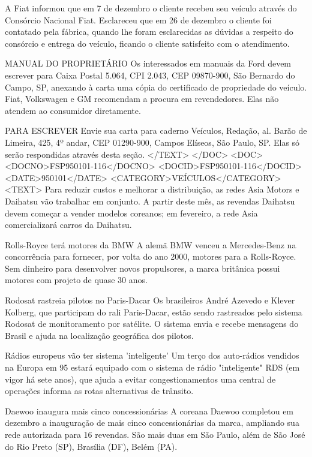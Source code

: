 A Fiat informou que em 7 de dezembro o cliente recebeu seu veículo através do Consórcio Nacional Fiat. Esclareceu que em 26 de dezembro o cliente foi contatado pela fábrica, quando lhe foram esclarecidas as dúvidas a respeito do consórcio e entrega do veículo, ficando o cliente satisfeito com o atendimento.

MANUAL DO PROPRIETÁRIO 
Os interessados em manuais da Ford devem escrever para Caixa Postal 5.064, CPI 2.043, CEP 09870-900, São Bernardo do Campo, SP, anexando à carta uma cópia do certificado de propriedade do veículo. Fiat, Volkswagen e GM recomendam a procura em revendedores. Elas não atendem ao consumidor diretamente.

PARA ESCREVER 
Envie sua carta para caderno Veículos, Redação, al. Barão de Limeira, 425, 4º andar, CEP 01290-900, Campos Elíseos, São Paulo, SP. Elas só serão respondidas através desta seção.
</TEXT>
</DOC>
<DOC>
<DOCNO>FSP950101-116</DOCNO>
<DOCID>FSP950101-116</DOCID>
<DATE>950101</DATE>
<CATEGORY>VEÍCULOS</CATEGORY>
<TEXT>
Para reduzir custos e melhorar a distribuição, as redes Asia Motors e Daihatsu vão trabalhar em conjunto. A partir deste mês, as revendas Daihatsu devem começar a vender modelos coreanos;
em fevereiro, a rede Asia comercializará carros da Daihatsu.

Rolls-Royce terá motores da BMW 
A alemã BMW venceu a Mercedes-Benz na concorrência para fornecer, por volta do ano 2000, motores para a Rolls-Royce. Sem dinheiro para desenvolver novos propulsores, a marca britânica possui motores com projeto de quase 30 anos.

Rodosat rastreia pilotos no Paris-Dacar 
Os brasileiros André Azevedo e Klever Kolberg, que participam do rali Paris-Dacar, estão sendo rastreados pelo sistema Rodosat de monitoramento por satélite. O sistema envia e recebe mensagens do Brasil e ajuda na localização geográfica dos pilotos.

Rádios europeus vão ter sistema 'inteligente' 
Um terço dos auto-rádios vendidos na Europa em 95 estará equipado com o sistema de rádio "inteligente" RDS (em vigor há sete anos), que ajuda a evitar congestionamentos uma central de operações informa as rotas alternativas de trânsito.

Daewoo inaugura mais cinco concessionárias 
A coreana Daewoo completou em dezembro a inauguração de mais cinco concessionárias da marca, ampliando sua rede autorizada para 16 revendas. São mais duas em São Paulo, além de São José do Rio Preto (SP), Brasília (DF), Belém (PA).

